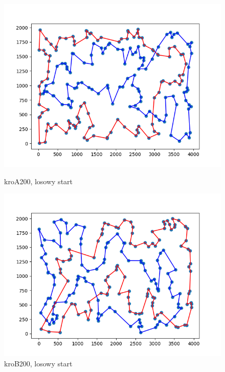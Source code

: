 \documentclass[11pt]{article}
\begin{document}
\begin{figure}[H]
    \begin{minipage}[t]{0.45\textwidth}
        \centering
        \includegraphics[width=\linewidth]{best_paths/kroA200/HAE+Mutation+LS}
        \caption{kroA200, losowy start}
    \end{minipage}
    \hfill
    \begin{minipage}[t]{0.45\textwidth}
        \centering
        \includegraphics[width=\linewidth]{best_paths/kroB200/HAE+Mutation+LS}
        \caption{kroB200, losowy start}
    \end{minipage}\label{fig:figure8}
\end{figure}
\end{document}
